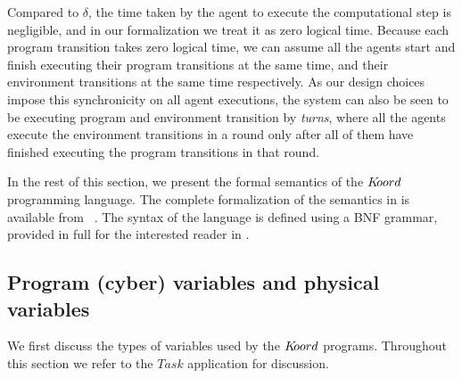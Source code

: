 
Compared to $\delta$, the time taken by the agent to execute the computational step is negligible, and in our formalization we treat it as zero logical time. Because each program transition takes zero logical time, we can assume all the agents start and finish executing their program transitions at the same time, and their environment transitions at the same time respectively. As our design choices impose this synchronicity on all agent executions, the system can also be seen to be executing program and environment transition by \emph{turns}, where all the agents execute the environment transitions in a round only after all of them have finished executing the program transitions in that round.  


 In the rest of this section, we present the formal semantics of the $K\kern-2pt oord$ programming language. The complete formalization of the semantics in \K is available from~\cite{} . The syntax of the language is defined using a BNF grammar, provided in full for the interested reader in .
 
\subsection{Program (cyber) variables and physical variables}

We first discuss the types of variables used by the $K\kern-2pt oord$ programs. Throughout this section we refer to the $\mathit{Task}$ application for discussion.


